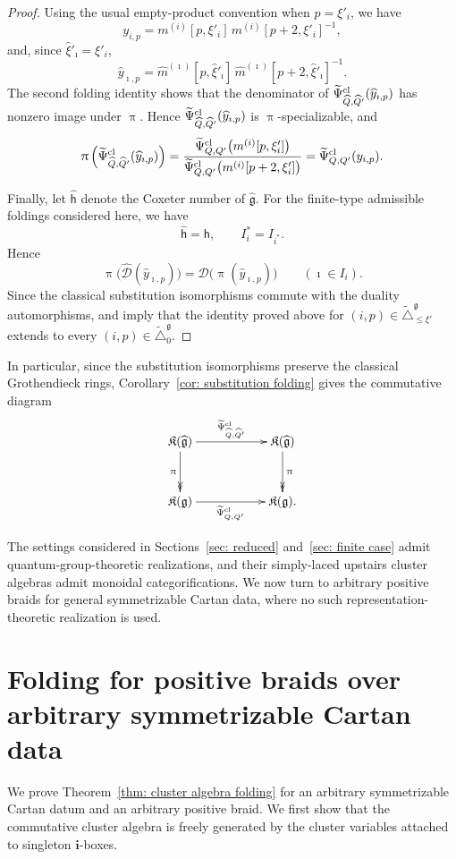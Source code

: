 \documentclass[12pt, leqno]{amsart}
\numberwithin{equation}{section}
\theoremstyle{plain}
\theoremstyle{definition}
\newcommand{\hxi}{{\widehat{\xi}}}
\newcommand{\g}{\mathfrak{g}}
\newcommand{\Dynkin}{\triangle}
\newcommand{\im}{\imath}
\newcommand{\hQ}{\widehat{Q}}
\newcommand{\hhm}{\widehat{m}}
\newcommand{\hg}{{\widehat{\g}}}
\newcommand{\hy}{\widehat{y}}
\newcommand{\frakK}{\mathfrak{K}}
\newcommand{\sfh}{\mathsf{h}}
\newcommand{\bfi}{\mathbf{i}}
\newcommand{\calD}{\mathcal{D}}
\newcommand{\tDynkin}{{\widetilde{\Dynkin}}}
\newcommand{\tPsi}{{\widetilde{\Psi}}}
\begin{document}
\begin{proof}
Using the usual empty-product convention when $p=\xi'_i$, we have
\[
y_{i,p} = m^{(i)}[p,\xi'_i]\, m^{(i)}[p+2,\xi'_i]^{-1},
\]
and, since $\hxi'_\im=\xi'_i$,
\[
\hy_{\im,p} = \hhm^{(\im)}[p,\hxi'_\im]\, \hhm^{(\im)}[p+2,\hxi'_\im]^{-1}.
\]
The second folding identity shows that the denominator of
$\tPsi^{\rm cl}_{\hQ,\hQ'}(\hy_{\im,p})$ has nonzero image under
$\uppi$.  Hence
$\tPsi^{\rm cl}_{\hQ,\hQ'}(\hy_{\im,p})$ is
$\uppi$-specializable, and
\[
\uppi\left(\tPsi^{\rm cl}_{\hQ,\hQ'}(\hy_{\im,p})\right)
=\frac{\tPsi^{\rm cl}_{Q,Q'}\bigl(m^{(i)}[p,\xi'_i]\bigr)}{\tPsi^{\rm cl}_{Q,Q'}\bigl(m^{(i)}[p+2,\xi'_i]\bigr)}
=\tPsi^{\rm cl}_{Q,Q'}(y_{i,p}).
\]




Finally, let $\widehat{\sfh}$ denote the Coxeter number of $\hg$.
For the finite-type admissible foldings considered here, we have
\[
\widehat{\sfh}=\sfh,
\qquad I_i^*=I_{i^*}.
\] 
Hence
\[
\uppi\bigl(\widehat{\calD}(\hy_{\im,p})\bigr)
= \calD\bigl(\uppi(\hy_{\im,p})\bigr) \qquad (\im\in I_i).
\]
Since the classical substitution isomorphisms commute with the
duality automorphisms,  \cite[Theorem~6.3]{FHOO} and \cite[Proposition~5.16]{LO24} imply that
the identity proved above for
$(i,p)\in\tDynkin_{\leq\xi'}^\g$
extends to every $(i,p)\in\tDynkin_0^\g$.
\end{proof}

In particular, since the substitution isomorphisms preserve the
classical Grothendieck rings, Corollary~\ref{cor: substitution folding}
gives the commutative diagram
\[
\xymatrix@C=55pt@R=32pt{
\frakK(\hg)
  \ar[r]^-{\tPsi^{\rm cl}_{\hQ,\hQ'}}
  \ar@{->>}[d]_{\uppi}
&
\frakK(\hg)
  \ar@{->>}[d]^{\uppi}
\\
\frakK(\g)
  \ar[r]_-{\tPsi^{\rm cl}_{Q,Q'}}
&
\frakK(\g).
}
\]

The settings considered in
Sections~\ref{sec: reduced} and~\ref{sec: finite case} admit
quantum-group-theoretic realizations, and their simply-laced upstairs
cluster algebras admit monoidal categorifications.  We now turn to
arbitrary positive braids for general symmetrizable Cartan data,
where no such representation-theoretic realization is used.  


\section{Folding for positive braids over arbitrary symmetrizable Cartan data}
\label{sec: arbitrary positive braid folding}

We prove Theorem~\ref{thm: cluster algebra folding} for an arbitrary
symmetrizable Cartan datum and an arbitrary positive braid.  We first
show that the commutative cluster algebra is freely generated by the
cluster variables attached to singleton $\bfi$-boxes.
\end{document}
